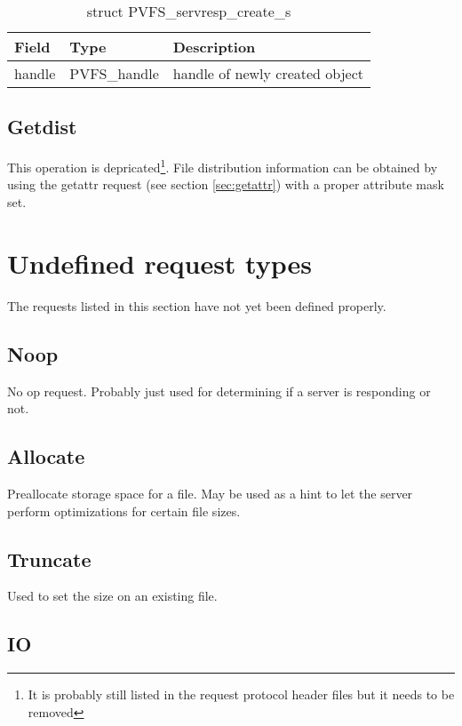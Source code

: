 \documentclass[11pt, letterpaper]{article} %
\begin{document}
\begin{table}[H]
\begin{tabular}{|l|l|l|}
\hline
Field & Type & Description \\
\hline
\hline
handle & PVFS\_handle & handle of newly created object\\
\hline
\end{tabular}
\caption{struct PVFS\_servresp\_create\_s \label{tab:respcreate}}
\end{table}


\subsection{Getdist}

This operation is depricated\footnote{It is probably still listed in
the request protocol header files but it needs to be removed}.  File
distribution information can be obtained by using the getattr request
(see section \ref{sec:getattr}) with a proper attribute mask set.

\section{Undefined request types}

The requests listed in this section have not yet been defined properly.

\subsection{Noop}

No op request.  Probably just used for determining if a server is
responding or not.

\subsection{Allocate}

Preallocate storage space for a file.  May be used as a hint to let the
server perform optimizations for certain file sizes.

\subsection{Truncate}

Used to set the size on an existing file.

\subsection{IO}
\end{document}
